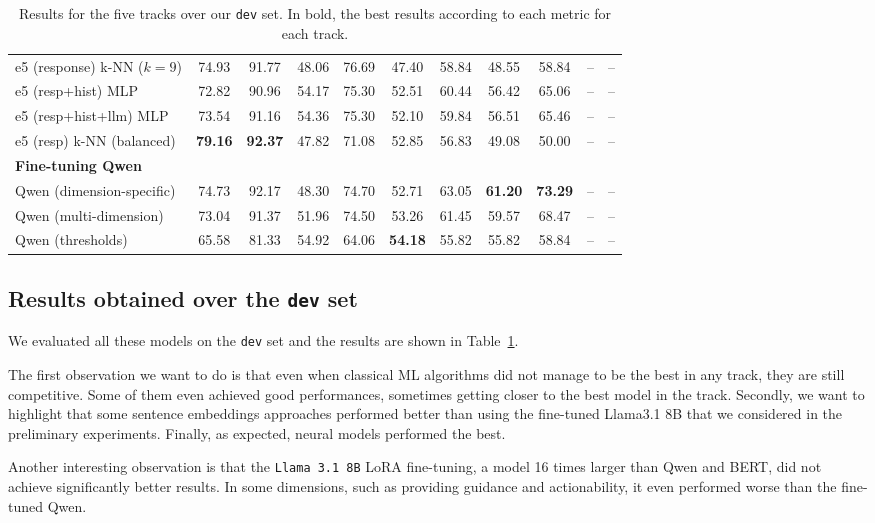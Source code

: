\documentclass[11pt]{article}
\begin{document}
\begin{table}[ht!]
{\begin{tabular}{lcccccccccc}
e5 (response) k-NN ($k=9$) & 74.93 & 91.77 & 48.06 & 76.69 & 47.40 & 58.84 & 48.55 & 58.84 & -- & -- \\
e5 (resp+hist) MLP & 72.82 & 90.96 & 54.17 & 75.30 & 52.51 & 60.44 & 56.42 & 65.06 & -- & -- \\
e5 (resp+hist+llm) MLP  & 73.54 & 91.16 & 54.36 & 75.30 & 52.10 & 59.84 & 56.51 & 65.46 & -- & -- \\
e5 (resp) k-NN (balanced) & \textbf{79.16} & \textbf{92.37} & 47.82 & 71.08 & 52.85 & 56.83 & 49.08 & 50.00 & -- & -- \\
\hline
\multicolumn{9}{l}{\textbf{Fine-tuning Qwen}} \\
\hline
Qwen (dimension-specific) & 74.73 & 92.17 & 48.30 & 74.70 & 52.71 & 63.05 & \textbf{61.20} & \textbf{73.29} & -- & -- \\
Qwen (multi-dimension) & 73.04 & 91.37 & 51.96 & 74.50 & 53.26 & 61.45 & 59.57 & 68.47 & -- & -- \\
Qwen (thresholds) & 65.58 & 81.33 & 54.92 & 64.06 & \textbf{54.18} & 55.82 & 55.82 & 58.84 & -- & -- \\
\hline
\end{tabular}
}
\caption{Results for the five tracks over our \texttt{dev} set. In bold, the best results according to each metric for each track.}
\label{tab:dev_results}
\end{table}

\subsection{Results obtained over the \texttt{dev} set}
\label{sec:results_dev}

We evaluated all these models on the \texttt{dev} set and the results are shown in Table~\ref{tab:dev_results}.

The first observation we want to do is that even when classical ML algorithms did not manage to be the best in any track, they are still competitive.
Some of them even achieved good performances, sometimes getting closer to the best model in the track.
Secondly, we want to highlight that some sentence embeddings approaches performed better than using the fine-tuned Llama3.1 8B that we considered in the preliminary experiments.
Finally, as expected, neural models performed the best.

Another interesting observation is that the \texttt{Llama 3.1 8B} LoRA fine-tuning, a model 16 times larger than Qwen and BERT, did not achieve significantly better results.
In some dimensions, such as providing guidance and actionability, it even performed worse than the fine-tuned Qwen.\\
\end{document}
